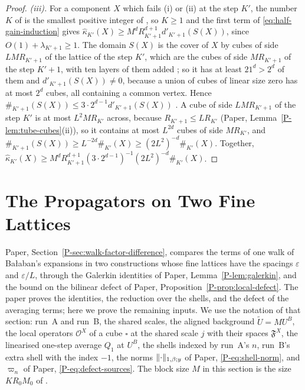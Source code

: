 \documentclass[11pt]{preprint}
\DeclarePairedDelimiter{\norm}{\lVert}{\rVert}
\numberwithin{equation}{section}
\theoremstyle{definition}
\theoremstyle{remark}
\theoremstyle{plain}
\begin{document}
\begin{proof}
\emph{(iii).} For a component $X$ which fails (i) or (ii) at the step $K'$, the number $K$ of \cite[(1.80)]{BalabanLFR2} is the smallest positive integer of \cite[p.~384]{BalabanLFR2}, so $K \geq 1$ and the first term of \eqref{eq:half-gain-induction} gives $\hat\kappa_{K'}(X) \geq M^dR_{K'+1}^{d+1}d'_{K'+1}(S(X))$, since $O(1) + \lambda_{K'+1} \geq 1$. The domain $S(X)$ is the cover of $X$ by cubes of side $LMR_{K'+1}$ of the lattice of the step $K'$, which are the cubes of side $MR_{K'+1}$ of the step $K' + 1$, with ten layers of them added \cite[p.~384]{BalabanLFR2}; so it has at least $21^d > 2^d$ of them and $d'_{K'+1}(S(X)) \neq 0$, because a union of cubes of linear size zero has at most $2^d$ cubes, all containing a common vertex. Hence $\#_{K'+1}(S(X)) \leq 3 \cdot 2^{d-1}d'_{K'+1}(S(X))$ \cite[p.~384]{BalabanLFR2}. A cube of side $LMR_{K'+1}$ of the step $K'$ is at most $L^2MR_{K'}$ across, because $R_{K'+1} \leq LR_{K'}$ (Paper, Lemma~\ref{P-lem:tube-cubes}(ii)), so it contains at most $L^{2d}$ cubes of side $MR_{K'}$, and $\#_{K'+1}(S(X)) \geq L^{-2d}\#_{K'}(X) \geq (2L^2)^{-d}\#_{K'}(X)$. Together, $\hat\kappa_{K'}(X) \geq M^dR_{K'+1}^{d+1}(3 \cdot 2^{d-1})^{-1}(2L^2)^{-d}\#_{K'}(X)$.
\end{proof}

\section{The Propagators on Two Fine Lattices}\label{sec:two-lattices}

Paper, Section~\ref{P-sec:walk-factor-difference}, compares the terms of one walk of Ba{\l}aban's expansions in two constructions whose fine lattices have the spacings $\varepsilon$ and $\varepsilon/L$, through the Galerkin identities of Paper, Lemma~\ref{P-lem:galerkin}, and the bound on the bilinear defect of Paper, Proposition~\ref{P-prop:local-defect}. The paper proves the identities, the reduction over the shells, and the defect of the averaging terms; here we prove the remaining inputs. We use the notation of that section: run~A and run~B, the shared scales, the aligned background $\tilde U = MU^B$, the local operators $\mathcal O^X$ of a cube $\square$ at the shared scale $j$ with their spaces $\mathfrak F^X$, the linearised one-step average $Q_1$ at $U^B$, the shells indexed by run~A's $n$, run~B's extra shell with the index $-1$, the norms $\norm{\cdot}_{1,\beta;y}$ of Paper, \eqref{P-eq:shell-norm}, and $\varpi_n$ of Paper, \eqref{P-eq:defect-sources}. The block size $M$ in this section is the size $KR_0M_0$ of \cite[p.~408]{BalabanPBG}.
\end{document}
